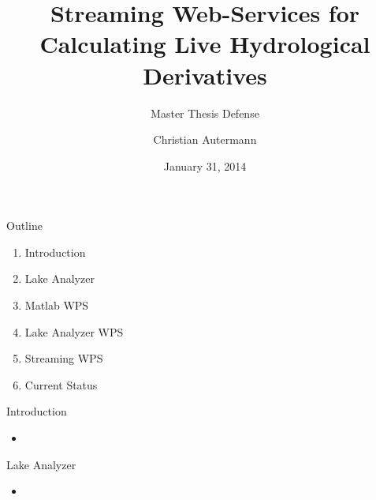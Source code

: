 \documentclass[xcolor=svgnames,professionalfonts,11pt,aspectratio=43,handout]{beamer}
\title{Streaming Web-Services for Calculating Live Hydrological Derivatives}
\subtitle{Master Thesis Defense}
\institute{Supervisors: Edzer Pebesma (IfGI), Jordan Read (USGS CIDA)}
\author{Christian Autermann}
\date{January 31, 2014}
\begin{document}
\frame{\titlepage}

\begin{frame}[t]{Outline}
  \begin{enumerate}
    \item Introduction
    \item Lake Analyzer
    \item Matlab WPS
    \item Lake Analyzer WPS
    \item Streaming WPS
    \item Current Status
  \end{enumerate}
\end{frame}


\begin{frame}[t]{Introduction}
  \begin{itemize}
    \item
  \end{itemize}
\end{frame}


\begin{frame}[t]{Lake Analyzer}
  \begin{itemize}
    \item
  \end{itemize}
\end{frame}
\end{document}
